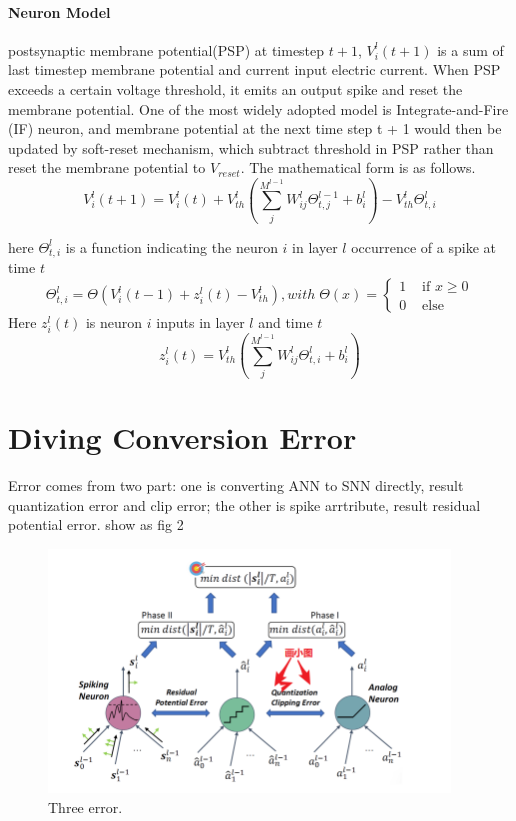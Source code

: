 \documentclass{article}
\begin{document}
\paragraph{Neuron Model} postsynaptic membrane potential(PSP) at timestep $t+1$, $V_i^l(t+1)$ is a sum of last timestep membrane potential and current input electric current. When PSP exceeds a certain voltage threshold, it emits an output spike and reset the membrane potential.
One of the most widely adopted model is Integrate-and-Fire (IF) neuron, and membrane potential at the next time
step t + 1 would then be updated by soft-reset mechanism, which subtract threshold in PSP rather than reset the membrane potential to $V_{reset}$. The mathematical form is as follows.
\begin{equation}
V_i^l(t + 1)=V_{i}^{l}(t)+V_{th}^l\left(\sum_j^{M^{l-1}}W_{ij}^l\Theta_{t,j}^{l-1}+b_i^l\right)-V_{th}^l\Theta_{t,i}^{l}
\end{equation}

here $\Theta_{t,i}^{l}$ is a function indicating the neuron $i$ in layer $l$ occurrence of a spike at time $t$
\begin{equation}
  \Theta_{t, i}^{l}=\Theta\left(V_{i}^{l}(t-1)+z_{i}^{l}(t)-V_{th}^l\right), with \; \Theta(x)= \begin{cases}1 & \text { if } x \geq 0 \\ 0 & \text { else }\end{cases}
\end{equation}
Here $z_i^l(t)$ is neuron $i$ inputs in layer $l$ and time $t$
\begin{equation}
  z_{i}^{l}(t) = V_{th}^l\left(\sum_j^{M^{l-1}}W_{ij}^l\Theta_{t,i}^{l}+b_i^l\right)
\end{equation}

\section{Diving Conversion Error}
Error comes from two part: one is converting ANN to SNN directly, result quantization error and clip error; the other is spike arrtribute, result residual potential error.
show as fig 2
\begin{figure}[htbp]
  \centering
  \includegraphics[width=0.95\textwidth]{test.png}
  \caption{Three error.}
\end{figure}
\end{document}

